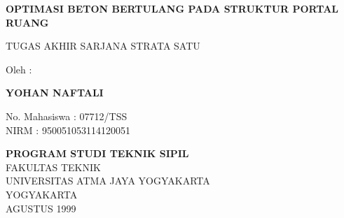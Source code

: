\begin{titlepage}
\begin{center}
\vspace*{1.5cm}
{\Large\bfseries OPTIMASI BETON BERTULANG PADA STRUKTUR PORTAL RUANG}

\vspace{1.5cm}
{\large TUGAS AKHIR SARJANA STRATA SATU}

\vspace{3cm}
Oleh :

\vspace{0.5cm}
{\large\bfseries YOHAN NAFTALI}

\vspace{0.3cm}
No. Mahasiswa : 07712/TSS \\
NIRM : 950051053114120051

\vfill

{\bfseries PROGRAM STUDI TEKNIK SIPIL}\\
FAKULTAS TEKNIK\\
UNIVERSITAS ATMA JAYA YOGYAKARTA\\
YOGYAKARTA\\
AGUSTUS 1999

\end{center}
\end{titlepage}
